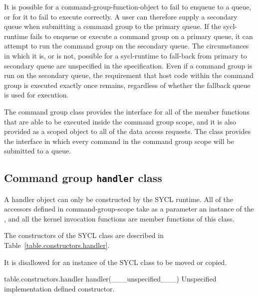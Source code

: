 It is possible for a \gls{command-group-function-object} to fail to enqueue to a queue,
or for it to fail to execute correctly. A user can therefore supply a secondary
queue when submitting a command group to the primary queue. If the \gls{sycl-runtime}
fails to enqueue or execute a command group on a primary queue, it can attempt
to run the command group on the secondary queue. The circumstances in which it
is, or is not, possible for a \gls{sycl-runtime} to fall-back from primary to
secondary queue are unspecified in the specification.  Even if a command group
is run on the secondary queue, the requirement that host code within the command group
is executed exactly once remains, regardless of whether the fallback queue is used for
execution.

The command group  class provides the interface
for all of the member functions that are able to be executed inside the command group
scope, and it is also provided as a scoped object to all of the data access
requests. The  class provides the interface
in which every command in the command group scope will be submitted to a queue.


\subsection{Command group \texttt{handler} class}
\label{sec:handlerClass}

A \gls{handler} object can only be constructed by the SYCL
runtime. All of the accessors defined in \gls{command-group-scope} take as a
parameter an instance of the , and all the
kernel invocation functions are member functions of this class.

The constructors of the SYCL  class are described in Table~\ref{table.constructors.handler}.

It is disallowed for an instance of the SYCL  class to be moved or copied.



{table.constructors.handler}
  \addRow
    {handler(___unspecified___)}
    {
      Unspecified implementation defined constructor.
    }
\completeTable

